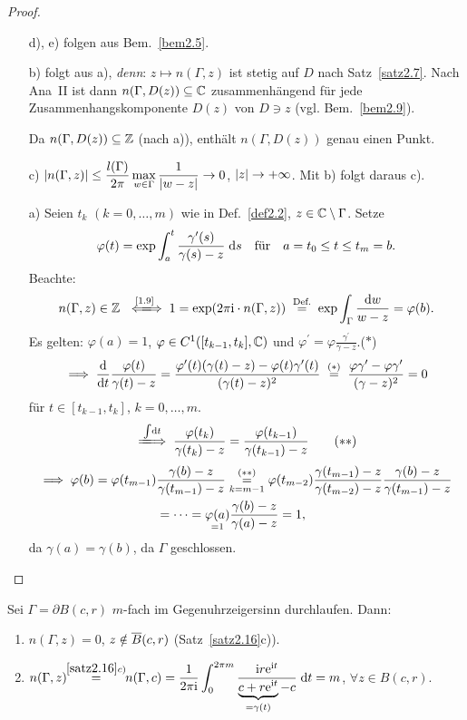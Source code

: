 \documentclass[a4paper,twoside,DIV15,BCOR12mm]{scrbook}
\begin{document}
\begin{proof}\begin{itemize}
\item[d),]e) folgen aus Bem.~\ref{bem2.5}.

\item[b)] folgt aus a), \textit{denn}: $z\mapsto n(\Gamma,z)$ ist stetig auf $D$ nach Satz~\ref{satz2.7}. Nach Ana~II ist dann $n(\Gamma,D(z))\subseteq\mathbb{C}$ zusammenhängend für jede Zusammenhangskomponente $D(z)$ von $D\ni z$ (vgl. Bem.~\ref{bem2.9}).

Da $n(\Gamma,D(z))\subseteq\mathbb{Z}$ (nach a)), enthält $n(\Gamma,D(z))$ genau einen Punkt.

\item[c)] $\displaystyle\left\lvert n(\Gamma,z)\right\lvert\leq\frac{l(\Gamma)}{2\pi}\max_{w\in\Gamma}\frac{1}{\left\lvert w-z\right\lvert}\rightarrow 0$, $\left\lvert z\right\lvert\rightarrow+\infty$. Mit b) folgt daraus c).

\item[a)] Seien $t_k$ $(k=0,\dotsc,m)$ wie in Def.~\ref{def2.2}, $z\in\mathbb{C}\setminus\Gamma$. Setze 
\[\varphi(t) = \exp\int_{a}^{t}{\frac{\gamma^\prime(s)}{\gamma(s)-z}}\;\mathrm{d} s\quad\text{für}\quad a = t_0\leq t\leq t_m = b.\]
Beachte:
\[n(\Gamma,z)\in\set{Z}\gdwnach{\eqref{1.9}} 1 = \exp(2\pi\i\cdot n(\Gamma,z)) \nach{=}{Def.} \exp\int_\Gamma\frac{\d w}{w-z} = \varphi(b).\]
Es gelten: $\varphi(a) = 1$, $\varphi\in C^1([t_{k-1},t_k],\mathbb{C})$ und $\varphi^\prime = \varphi\frac{\gamma^\prime}{\gamma-z}$.\hfill($*$)
\[\folgt \frac{\d}{\d t}\frac{\varphi(t)}{\gamma(t) - z} = \frac{\varphi^\prime(t)(\gamma(t)-z)-\varphi(t)\gamma^\prime(t)}{(\gamma(t)-z)^2} \wegen{=}{(*)} \frac{\varphi\gamma^\prime-\varphi\gamma^\prime}{(\gamma-z)^2} = 0\]
für $t\in[t_{k-1},t_k]$, $k=0,\dotsc,m$.
\[\folgtwegen{\int\!\d t}\frac{\varphi(t_k)}{\gamma(t_k)-z} = \frac{\varphi(t_{k-1})}{\gamma(t_{k-1})-z}\tag{$**$}\]
\begin{align*}
\implies\varphi(b)=\varphi(t_{m-1})&\frac{\gamma(b)-z}{\gamma(t_{m-1})-z} \overset{(**)}{\underset{k=m-1}{=}} \varphi(t_{m-2})\frac{\gamma(t_{m-1})-z}{\gamma(t_{m-2})-z}\frac{\gamma(b)-z}{\gamma(t_{m-1})-z}\\& = \dotsb = \underset{=1}{\varphi(a)}\frac{\gamma(b)-z}{\gamma(a)-z} = 1,
\end{align*}
da $\gamma(a) = \gamma(b)$, da $\Gamma$ geschlossen.\qedhere
\end{itemize}
\end{proof}

\begin{bsp}\label{bsp2.17}
Sei $\Gamma = \partial B(c,r)$ $m$-fach im Gegenuhrzeigersinn durchlaufen. Dann:
\begin{enumerate}
\item $n(\Gamma,z) = 0$, $z\notin \overline{B}(c,r)$ (Satz~\ref{satz2.16}c)).
\item $\displaystyle n(\Gamma,z)\!\! \overset{\ref{satz2.16}c)}{=}\!\! n(\Gamma,c) = \frac{1}{2\pi\mathrm{i}}\int_{0}^{2\pi m}{\frac{\mathrm{i} r\mathrm{e}^{\mathrm{i} t}}{\underbrace{c+r\mathrm{e}^{\mathrm{i} t}}_{=\gamma(t)}-c}}\;\mathrm{d} t = m$, $\forall z\in B(c,r)$.
\end{enumerate}
\end{bsp}
\end{document}
